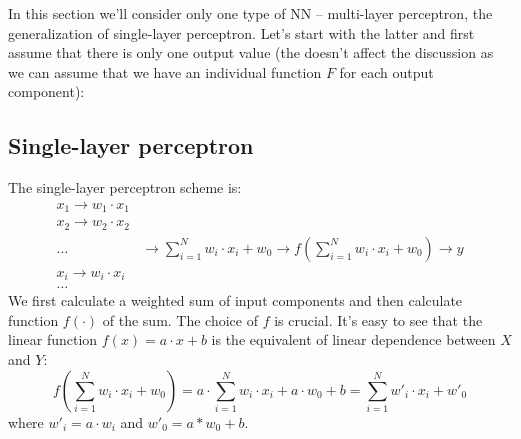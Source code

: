 \bigskip
\begin{center}
\end{center}

In this section we'll consider only one type of NN -- multi-layer
perceptron, the generalization of single-layer perceptron. Let's
start with the latter and first assume that there is only one output
value (the doesn't affect the discussion as we can assume that we have
an individual function $F$ for each output component):

\bigskip
\begin{center}
\end{center}


\subsection{Single-layer perceptron}

The single-layer perceptron scheme is:
$$
\begin{matrix}
x_1 \rightarrow w_1\cdot x_1 & \\
x_2 \rightarrow w_2\cdot x_2 & \\
\dots &
\rightarrow \sum_{i=1}^N w_i\cdot x_i + w_0 \rightarrow f(\sum_{i=1}^N w_i\cdot x_i + w_0) \rightarrow y \\
x_i \rightarrow w_i\cdot x_i & \\
\dots & 
\end{matrix}
$$
We first calculate a weighted sum of input components
and then calculate function $f(\cdot)$ of the sum.
The choice of $f$ is crucial. It's easy to see that the linear function
$f(x) = a\cdot x + b$ is the equivalent of linear dependence
between $X$ and $Y$:
$$
f(\sum_{i=1}^N w_i\cdot x_i + w_0) =
a\cdot\sum_{i=1}^N w_i\cdot x_i + a\cdot w_0 + b =
\sum_{i=1}^N w'_i\cdot x_i + w'_0
$$
where $w'_i = a\cdot w_i$ and $w'_0 = a*w_0+b$.

